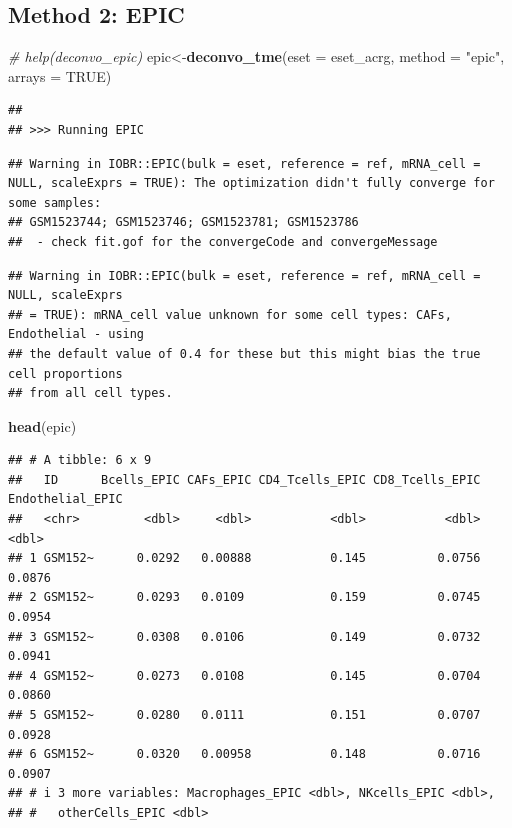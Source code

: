 \documentclass[
  12pt,
]{book}
\newenvironment{Shaded}{\begin{snugshade}}{\end{snugshade}}
\newcommand{\AttributeTok}[1]{\textcolor[rgb]{0.13,0.29,0.53}{#1}}
\newcommand{\CommentTok}[1]{\textcolor[rgb]{0.56,0.35,0.01}{\textit{#1}}}
\newcommand{\ConstantTok}[1]{\textcolor[rgb]{0.56,0.35,0.01}{#1}}
\newcommand{\FunctionTok}[1]{\textcolor[rgb]{0.13,0.29,0.53}{\textbf{#1}}}
\newcommand{\NormalTok}[1]{#1}
\newcommand{\OtherTok}[1]{\textcolor[rgb]{0.56,0.35,0.01}{#1}}
\newcommand{\StringTok}[1]{\textcolor[rgb]{0.31,0.60,0.02}{#1}}
\theoremstyle{definition}
\theoremstyle{definition}
\theoremstyle{definition}
\theoremstyle{definition}
\theoremstyle{remark}
\begin{document}
\hypertarget{method-2-epic}{%
\subsection{Method 2: EPIC}\label{method-2-epic}}

\begin{Shaded}
\begin{Highlighting}[]
\CommentTok{\# help(deconvo\_epic)}
\NormalTok{epic}\OtherTok{\textless{}{-}}\FunctionTok{deconvo\_tme}\NormalTok{(}\AttributeTok{eset =}\NormalTok{ eset\_acrg, }\AttributeTok{method =} \StringTok{"epic"}\NormalTok{, }\AttributeTok{arrays =} \ConstantTok{TRUE}\NormalTok{)}
\end{Highlighting}
\end{Shaded}

\begin{verbatim}
## 
## >>> Running EPIC
\end{verbatim}

\begin{verbatim}
## Warning in IOBR::EPIC(bulk = eset, reference = ref, mRNA_cell = NULL, scaleExprs = TRUE): The optimization didn't fully converge for some samples:
## GSM1523744; GSM1523746; GSM1523781; GSM1523786
##  - check fit.gof for the convergeCode and convergeMessage
\end{verbatim}

\begin{verbatim}
## Warning in IOBR::EPIC(bulk = eset, reference = ref, mRNA_cell = NULL, scaleExprs
## = TRUE): mRNA_cell value unknown for some cell types: CAFs, Endothelial - using
## the default value of 0.4 for these but this might bias the true cell proportions
## from all cell types.
\end{verbatim}

\begin{Shaded}
\begin{Highlighting}[]
\FunctionTok{head}\NormalTok{(epic)}
\end{Highlighting}
\end{Shaded}

\begin{verbatim}
## # A tibble: 6 x 9
##   ID      Bcells_EPIC CAFs_EPIC CD4_Tcells_EPIC CD8_Tcells_EPIC Endothelial_EPIC
##   <chr>         <dbl>     <dbl>           <dbl>           <dbl>            <dbl>
## 1 GSM152~      0.0292   0.00888           0.145          0.0756           0.0876
## 2 GSM152~      0.0293   0.0109            0.159          0.0745           0.0954
## 3 GSM152~      0.0308   0.0106            0.149          0.0732           0.0941
## 4 GSM152~      0.0273   0.0108            0.145          0.0704           0.0860
## 5 GSM152~      0.0280   0.0111            0.151          0.0707           0.0928
## 6 GSM152~      0.0320   0.00958           0.148          0.0716           0.0907
## # i 3 more variables: Macrophages_EPIC <dbl>, NKcells_EPIC <dbl>,
## #   otherCells_EPIC <dbl>
\end{verbatim}
\end{document}
